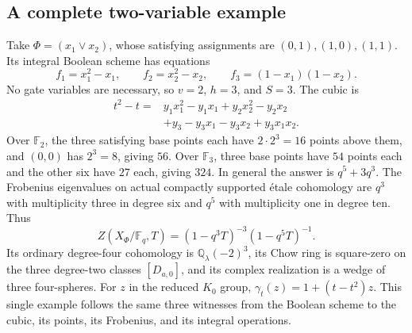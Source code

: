 \subsection{A complete two-variable example}
Take $\Phi=(x_1\vee x_2)$, whose satisfying assignments are $(0,1),(1,0),(1,1)$. Its integral Boolean scheme has equations
\[
 f_1=x_1^2-x_1,\qquad f_2=x_2^2-x_2,\qquad
 f_3=(1-x_1)(1-x_2).
\]
No gate variables are necessary, so $v=2$, $h=3$, and $S=3$. The cubic is
\begin{align*}
 t^2-t={}&y_1x_1^2-y_1x_1+y_2x_2^2-y_2x_2\\
         &+y_3-y_3x_1-y_3x_2+y_3x_1x_2.
\end{align*}
Over $\mathbb F_2$, the three satisfying base points each have $2\cdot2^3=16$ points above them, and $(0,0)$ has $2^3=8$, giving $56$. Over $\mathbb F_3$, three base points have $54$ points each and the other six have $27$ each, giving $324$. In general the answer is $q^5+3q^3$. The Frobenius eigenvalues on actual compactly supported \'etale cohomology are $q^3$ with multiplicity three in degree six and $q^5$ with multiplicity one in degree ten. Thus
\[
 Z(X_\Phi/\mathbb F_q,T)=(1-q^3T)^{-3}(1-q^5T)^{-1}.
\]
Its ordinary degree-four cohomology is $\mathbb Q_\lambda(-2)^3$, its Chow ring is square-zero on the three degree-two classes $[D_{a,0}]$, and its complex realization is a wedge of three four-spheres. For $z$ in the reduced $K_0$ group,
$\gamma_t(z)=1+(t-t^2)z$. This single example follows the same three witnesses from the Boolean scheme to the cubic, its points, its Frobenius, and its integral operations.
